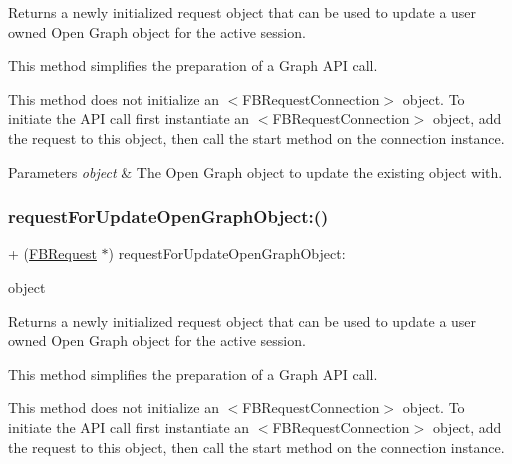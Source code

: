 Returns a newly initialized request object that can be used to update a user owned Open Graph object for the active session.

This method simplifies the preparation of a Graph A\+PI call.

This method does not initialize an $<$\+F\+B\+Request\+Connection$>$ object. To initiate the A\+PI call first instantiate an $<$\+F\+B\+Request\+Connection$>$ object, add the request to this object, then call the {\ttfamily start} method on the connection instance.


\begin{DoxyParams}{Parameters}
{\em object} & The Open Graph object to update the existing object with. \\
\hline
\end{DoxyParams}
\mbox{\label{interfaceFBRequest_ab92e50866d79923cfb17f1f96f06530b}} 
\subsubsection{\texorpdfstring{request\+For\+Update\+Open\+Graph\+Object\+:()}{requestForUpdateOpenGraphObject:()}\hspace{0.1cm}{\footnotesize\ttfamily [5/5]}}
{\footnotesize\ttfamily + (\hyperlink{interfaceFBRequest}{F\+B\+Request} $\ast$) request\+For\+Update\+Open\+Graph\+Object\+: \begin{DoxyParamCaption}\item[{(id$<$ \hyperlink{protocolFBOpenGraphObject-p}{F\+B\+Open\+Graph\+Object} $>$)}]{object }\end{DoxyParamCaption}}

Returns a newly initialized request object that can be used to update a user owned Open Graph object for the active session.

This method simplifies the preparation of a Graph A\+PI call.

This method does not initialize an $<$\+F\+B\+Request\+Connection$>$ object. To initiate the A\+PI call first instantiate an $<$\+F\+B\+Request\+Connection$>$ object, add the request to this object, then call the {\ttfamily start} method on the connection instance.


